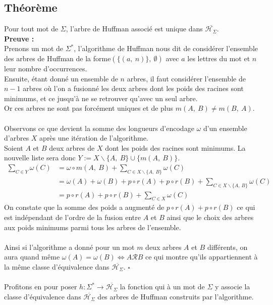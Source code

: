 \documentclass[a4paper, 12pt]{article}
\let\iff\Longleftrightarrow
\let\qed\square
\begin{document}
\subsection{Théorème}
Pour tout mot de $\Sigma$, l'arbre de Huffman associé est unique dans $\overline{\mathcal{H}_\Sigma}$. \\
\textbf{Preuve :} \\
Prenons un mot de $\Sigma^*$, l'algorithme de Huffman nous dit de considérer l'ensemble des arbres de Huffman de la forme$(\{(a,\ n)\},\ \emptyset)$ avec $a$ les lettres du mot et $n$ leur nombre d'occurrences. \\
Ensuite, étant donné un ensemble de $n$ arbres, il faut considérer l'ensemble de $n-1$ arbres où l'on a fusionné les deux arbres dont les poids des racines sont minimums, et ce jusqu'à ne se retrouver qu'avec un seul arbre. \\
Or ces arbres ne sont pas forcément uniques et de plus $m(A,\ B) \neq m(B,\ A)$. \\ \\
Observons ce que devient la somme des longueurs d'encodage $\omega$ d'un ensemble d'arbres $X$ après une itération de l'algorithme. \\
Soient $A$ et $B$ deux arbres de $X$ dont les poids des racines sont minimums. La nouvelle liste sera donc $Y := X\backslash\{A,\ B\}\cup\{m(A,\ B)\}$.
\begin{align*}
\sum_{C\in Y} \omega(C) &= \omega\circ m(A,\ B)+\sum_{C\in X\backslash\{A,\ B\}} \omega(C) \\
&= \omega(A)+\omega(B)+p\circ r(A)+p\circ r(B)+\sum_{C\in X\backslash\{A,\ B\}} \omega(C) \\
&= p\circ r(A)+p\circ r(B)+\sum_{C\in X} \omega(C)
\end{align*}
On constate que la somme des poids a augmenté de $p\circ r(A)+p\circ r(B)$ ce qui est indépendant de l'ordre de la fusion entre $A$ et $B$ ainsi que le choix des arbres aux poids minimums parmi tous les arbres de l'ensemble. \\ \\
Ainsi si l'algorithme a donné pour un mot $m$ deux arbres $A$ et $B$ différents, on aura quand même $\omega(A) = \omega(B) \iff A\mathcal{R}B$ ce qui montre qu'ils appartiennent à la même classe d'équivalence dans $\overline{\mathcal{H}_\Sigma}$. $\qed$ \\ \\
Profitons en pour poser $h: \Sigma^* \rightarrow \overline{\mathcal{H}_\Sigma}$ la fonction qui à un mot de $\Sigma$ y associe la classe d'équivalence dans $\overline{\mathcal{H}_\Sigma}$ des arbres de Huffman construits par l'algorithme.
\end{document}
